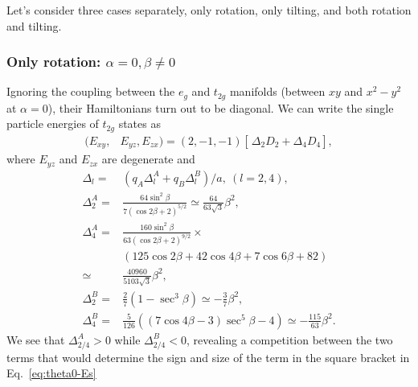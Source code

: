 \documentclass[a4paper,prb,twocolumn]{revtex4-1}  %
\begin{document}
Let's consider three cases separately, only rotation, only tilting, and both rotation and tilting.

\subsubsection{Only rotation: $\alpha=0,\beta\neq 0$}
\label{sec:alpha0}


Ignoring the coupling between the $e_{g}$ and $t_{2g}$ manifolds (between $xy$ and $x^2-y^2$ at $\alpha=0$),
their Hamiltonians turn out to be diagonal.
We can write the single particle energies of $t_{2g}$ states
as
\begin{align}
\label{eq:theta0-Es}
(E_{xy},&E_{yz},E_{zx})= (2, -1, -1)
\left[\frac{}{} \Delta_{2}  D_2 + \Delta_4 D_4\right],
 \end{align}
 where $E_{yz}$ and $E_{zx}$ are degenerate and 
\begin{align}
\Delta_{l} =&  \left(q_A \Delta_{l}^A + q_B\Delta_{l}^B\right)/a,~(l=2,4),\\
\Delta_{2}^A =& 
\frac{64 \sin ^2\beta }{7 (\cos 2 \beta +2)^{5/2}} %
 \simeq \frac{64}{63 \sqrt{3}}\beta ^2,\\
 \nonumber
\Delta_4^A =&
 \frac{160 \sin ^2\beta}{63 (\cos 2\beta+2)^{9/2}} \times \\
&  (125 \cos 2\beta+42 \cos 4\beta+7 \cos 6\beta+82)\\
\simeq& \frac{40960}{5103 \sqrt{3}}\beta ^2,\\
 \label{eq:theta0-delB2}
\Delta_{2}^B =& \frac{2}{7} \left(1-\sec ^3\beta\right)
\simeq -\frac{3}{7}\beta ^2,\\
\label{eq:theta0-delB4}
  \Delta_4^B =&\frac{5}{126} \left((7 \cos 4\beta-3) \sec ^5\beta-4\right)
  \simeq -\frac{115}{63}\beta ^2.
 \end{align}
 We see that $\Delta_{2/4}^A>0$ while $\Delta_{2/4}^B<0$,
 revealing a competition between the two terms 
 that would determine the sign and size of the term
  in the square bracket in Eq.~\ref{eq:theta0-Es} 
\end{document}
